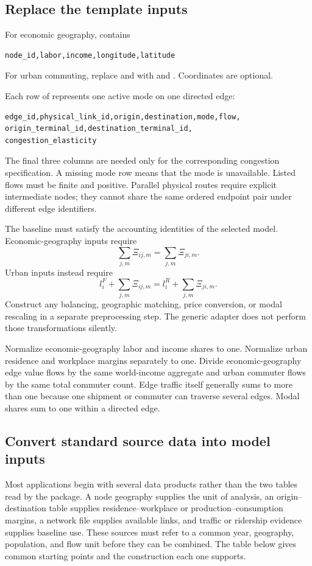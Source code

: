 \subsection{Replace the template inputs}

For economic geography,  contains
\begin{lstlisting}
node_id,labor,income,longitude,latitude
\end{lstlisting}
For urban commuting, replace  and  with
 and . Coordinates are optional.

Each row of  represents one active mode on one directed
edge:
\begin{lstlisting}
edge_id,physical_link_id,origin,destination,mode,flow,
origin_terminal_id,destination_terminal_id,
congestion_elasticity
\end{lstlisting}
The final three columns are needed only for the corresponding congestion
specification. A missing mode row means that the mode is unavailable. Listed
flows must be finite and positive. Parallel physical routes require explicit
intermediate nodes; they cannot share the same ordered endpoint pair under
different edge identifiers.

The baseline must satisfy the accounting identities of the selected model.
Economic-geography inputs require
\[
 \sum_{j,m}\Xi_{ij,m}=\sum_{j,m}\Xi_{ji,m}.
\]
Urban inputs instead require
\[
 l_i^F+\sum_{j,m}\Xi_{ij,m}
 =
 l_i^R+\sum_{j,m}\Xi_{ji,m}.
\]
Construct any balancing, geographic matching, price conversion, or modal
rescaling in a separate preprocessing step. The generic adapter does not
perform those transformations silently.

Normalize economic-geography labor and income shares to one. Normalize urban
residence and workplace margins separately to one. Divide economic-geography
edge value flows by the same world-income aggregate and urban commuter flows
by the same total commuter count. Edge traffic itself generally sums to more
than one because one shipment or commuter can traverse several edges. Modal
shares sum to one within a directed edge.

\subsection{Convert standard source data into model inputs}

Most applications begin with several data products rather than the two tables
read by the package. A node geography supplies the unit of analysis, an
origin--destination table supplies residence--workplace or
production--consumption margins, a network file supplies available links, and
traffic or ridership evidence supplies baseline use. These sources must refer
to a common year, geography, population, and flow unit before they can be
combined. The table below gives common starting points and the construction
each one supports.


